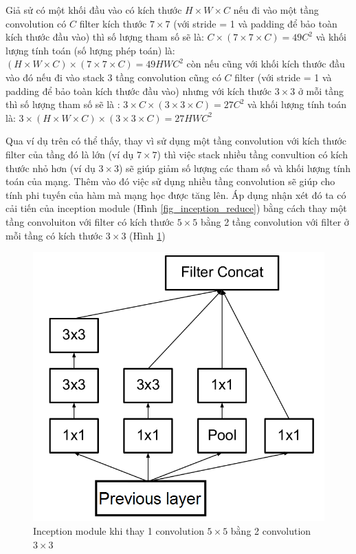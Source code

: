 \documentclass[a4paper,12pt]{report}
\begin{document}
\par Giả sử có một khối đầu vào có kích thước $H \times W \times C$ nếu đi vào một tầng convolution có $C$ filter kích thước $7 \times 7$ (với stride = 1 và padding để bảo toàn kích thước đầu vào) thì số lượng tham số sẽ là: $C \times (7 \times 7 \times C) = 49C^2$ và khối lượng tính toán (số lượng phép toán) là: $(H \times W \times C) \times (7 \times 7 \times C) = 49HWC^2$ còn nếu cũng với khối kích thước đầu vào đó nếu đi vào stack 3 tầng convolution cũng có $C$ filter (với stride = 1 và padding để bảo toàn kích thước đầu vào) nhưng với kích thước $3 \times 3$ ở mỗi tầng thì số lượng tham số sẽ là : $3 \times C \times (3 \times 3 \times C) = 27C^2$ và khối lượng tính toán là: $3 \times (H \times W \times C) \times (3 \times 3 \times C) = 27HWC^2$
\par Qua ví dụ trên có thể thấy, thay vì sử dụng một tầng convolution với kích thước filter của tầng đó là lớn (ví dụ $7 \times 7$) thì việc stack nhiều tầng convultion có kích thước nhỏ hơn (ví dụ $3 \times 3$) sẽ giúp giảm số lượng các tham số và khối lượng tính toán của mạng. Thêm vào đó việc sử dụng nhiều tầng convolution sẽ giúp cho tính phi tuyến của hàm mà mạng học được tăng lên. Áp dụng nhận xét đó ta có cải tiến của inception module (Hình \ref{fig_inception_reduce}) bằng cách thay một tầng convoluiton với filter có kích thước $5 \times 5$ bằng 2 tầng convolution với filter ở mỗi tầng có kích thước $3 \times 3$ (Hình \ref{fig_replace_5x5vs3x3})
\begin{figure}[H]
\centering 
\includegraphics[scale=0.4]{replace_5x5vs3x3.png}
\caption{Inception module khi thay 1 convolution $5 \times 5$ bằng 2 convolution $3 \times 3$}
\label{fig_replace_5x5vs3x3}
\end{figure}
\end{document}
